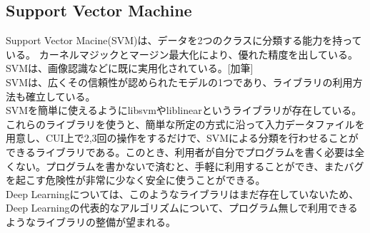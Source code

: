 \subsection{Support Vector Machine}
Support Vector Macine(SVM)は、データを2つのクラスに分類する能力を持っている。
カーネルマジックとマージン最大化により、優れた精度を出している。SVMは、画像認識などに既に実用化されている。[加筆]\\
SVMは、広くその信頼性が認められたモデルの1つであり、ライブラリの利用方法も確立している。\\
SVMを簡単に使えるようにlibsvmやliblinearというライブラリが存在している。これらのライブラリを使うと、簡単な所定の方式に沿って入力データファイルを用意し、CUI上で2,3回の操作をするだけで、SVMによる分類を行わせることができるライブラリである。このとき、利用者が自分でプログラムを書く必要は全くない。プログラムを書かないで済むと、手軽に利用することができ、またバグを起こす危険性が非常に少なく安全に使うことができる。\\
Deep Learningについては、このようなライブラリはまだ存在していないため、Deep Learningの代表的なアルゴリズムについて、プログラム無しで利用できるようなライブラリの整備が望まれる。
